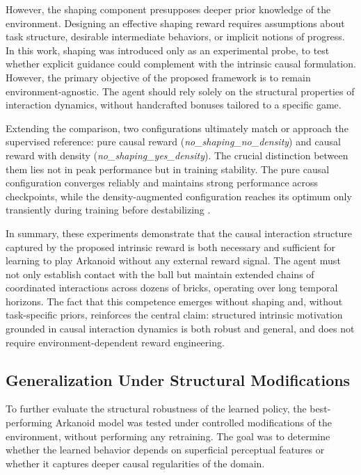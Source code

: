 \documentclass[12pt,a4paper]{report}
\begin{document}
However, the shaping component presupposes deeper prior knowledge of the environment. Designing an effective shaping reward requires assumptions about task structure, desirable intermediate behaviors, or implicit notions of progress. In this work, shaping was introduced only as an experimental probe, to test whether explicit guidance could complement with the intrinsic causal formulation. However, the primary objective of the proposed framework is to remain environment-agnostic. The agent should rely solely on the structural properties of interaction dynamics, without handcrafted bonuses tailored to a specific game.

Extending the comparison, two configurations ultimately match or approach the supervised reference: pure causal reward (\textit{no\_shaping\_no\_density}) and causal reward with density (\textit{no\_shaping\_yes\_density}). The crucial distinction between them lies not in peak performance but in training stability. The pure causal configuration converges reliably and maintains strong performance across checkpoints, while the density-augmented configuration reaches its optimum only transiently during training before destabilizing \cite{chiave69}.

In summary, these experiments demonstrate that the causal interaction structure captured by the proposed intrinsic reward is both necessary and sufficient for learning to play Arkanoid without any external reward signal. The agent must not only establish contact with the ball but maintain extended chains of coordinated interactions across dozens of bricks, operating over long temporal horizons. The fact that this competence emerges without shaping and, without task-specific priors, reinforces the central claim: structured intrinsic motivation grounded in causal interaction dynamics is both robust and general, and does not require environment-dependent reward engineering.



\subsection{Generalization Under Structural Modifications}
To further evaluate the structural robustness of the learned policy, the best-performing Arkanoid model was tested under controlled modifications of the environment, without performing any retraining. 
The goal was to determine whether the learned behavior depends on superficial perceptual features or whether it captures deeper causal regularities of the domain.
\end{document}
